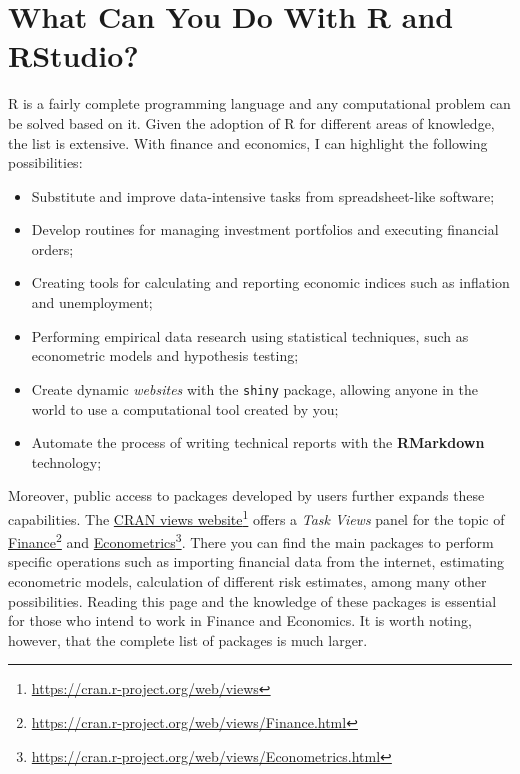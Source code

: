 \documentclass[
  12pt,
]{book}
\begin{document}
\hypertarget{what-can-you-do-with-r-and-rstudio}{%
\section{What Can You Do With R and RStudio?}\label{what-can-you-do-with-r-and-rstudio}}

R is a fairly complete programming language and any computational problem can be solved based on it. Given the adoption of R for different areas of knowledge, the list is extensive. With finance and economics, I can highlight the following possibilities:

\begin{itemize}
\item
  Substitute and improve data-intensive tasks from spreadsheet-like software;
\item
  Develop routines for managing investment portfolios and executing financial orders;
\item
  Creating tools for calculating and reporting economic indices such as inflation and unemployment;
\item
  Performing empirical data research using statistical techniques, such as econometric models and hypothesis testing;
\item
  Create dynamic \emph{websites} with the \texttt{shiny} \citep{R-shiny} package, allowing anyone in the world to use a computational tool created by you; 
\item
  Automate the process of writing technical reports with the \textbf{RMarkdown} technology; 
\end{itemize}

Moreover, public access to packages developed by users further expands these capabilities. The \href{https://cran.r-project.org/web/views}{CRAN views website}\footnote{\url{https://cran.r-project.org/web/views}} offers a \emph{Task Views} panel for the topic of \href{https://cran.r-project.org/web/views/Finance.html}{Finance}\footnote{\url{https://cran.r-project.org/web/views/Finance.html}} and \href{https://cran.r-project.org/web/views/Econometrics.html}{Econometrics}\footnote{\url{https://cran.r-project.org/web/views/Econometrics.html}}. There you can find the main packages to perform specific operations such as importing financial data from the internet, estimating econometric models, calculation of different risk estimates, among many other possibilities. Reading this page and the knowledge of these packages is essential for those who intend to work in Finance and Economics. It is worth noting, however, that the complete list of packages is much larger.
\end{document}
